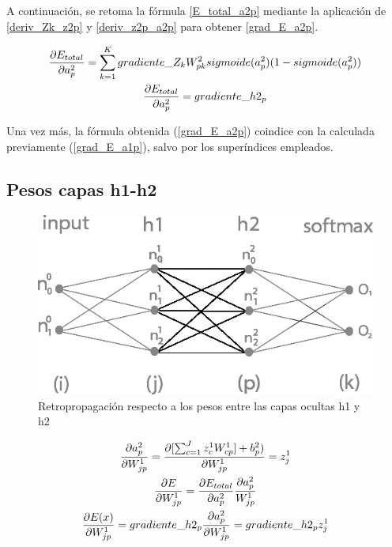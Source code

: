 A continuación, se retoma la fórmula \ref{E_total_a2p} mediante la aplicación de \ref{deriv_Zk_z2p} y \ref{deriv_z2p_a2p} para obtener \ref{grad_E_a2p}.

\begin{gather}
	\frac{\partial E_{total}}{\partial a^2_p} = \sum_{k=1}^K  gradiente\_Z_k   W^2_{pk}   sigmoide(a^2_p) (1-sigmoide(a^2_p)) \label{grad_E_a2p} \\
	\frac{\partial E_{total}}{\partial a^2_p} = gradiente\_h2_p \notag
\end{gather}

Una vez más, la fórmula obtenida (\ref{grad_E_a2p}) coindice con la calculada previamente (\ref{grad_E_a1p}), salvo por los superíndices empleados. \\

\subsection{Pesos capas h1-h2}

\begin{figure}[H]
	\centering
	\includegraphics[scale=0.35]{imagenes/nn_2_capa_pesos_h1_h2.jpg}  
	\caption{Retropropagación respecto a los pesos entre las capas ocultas h1 y h2}
	\label{fig:nn_2_pesos_h1_h2}
\end{figure}


\begin{gather}
	\frac{\partial a^2_p }{\partial W^1_{jp} } = \frac{\partial [\sum_{c=1}^{J} z^1_c   W^1_{cp}] + b^2_p)}{\partial W^1_{jp} } = z^1_j \notag \\
	\frac{\partial E}{\partial W^1_{jp}} = \frac{\partial E_{total} }{\partial a^2_p }   \frac{\partial a^2_p}{W^1_{jp}} \notag \\
	\frac{\partial E(x) }{\partial W^1_{jp} } = gradiente\_h2_p   \frac{\partial a^2_p }{\partial W^1_{jp} } = gradiente\_h2_p   z^1_j 
	\label{grad_w1jp}
\end{gather}

